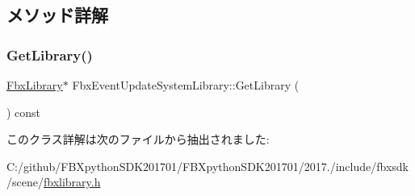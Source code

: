 \subsection{メソッド詳解}
\mbox{\label{class_fbx_event_update_system_library_a216f7eb4fed21eeac1aa0398fb164288}} 
\subsubsection{\texorpdfstring{Get\+Library()}{GetLibrary()}}
{\footnotesize\ttfamily \hyperlink{class_fbx_library}{Fbx\+Library}$\ast$ Fbx\+Event\+Update\+System\+Library\+::\+Get\+Library (\begin{DoxyParamCaption}{ }\end{DoxyParamCaption}) const}



このクラス詳解は次のファイルから抽出されました\+:\begin{DoxyCompactItemize}
\item 
C\+:/github/\+F\+B\+Xpython\+S\+D\+K201701/\+F\+B\+Xpython\+S\+D\+K201701/2017./include/fbxsdk/scene/\hyperlink{fbxlibrary_8h}{fbxlibrary.\+h}\end{DoxyCompactItemize}
